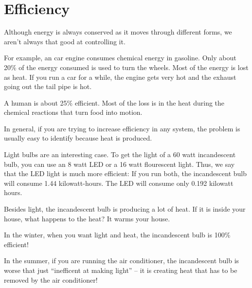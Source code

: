 \section{Efficiency}

Although energy is always conserved as it moves through different
forms, we aren't always that good at controlling it.

For example, an car engine consumes chemical energy in gasoline. Only
about 20\% of the energy consumed is used to turn the wheels.  Most of
the energy is lost as heat. If you run a car for a while, the engine
gets very hot and the exhaust going out the tail pipe is hot.

A human is about 25\% efficient. Most of the loss is in the heat
during the chemical reactions that turn food into motion.

In general, if you are trying to increase efficiency in any system,
the problem is usually easy to identify because heat is produced.

Light bulbs are an interesting case. To get the light of a 60 watt
incandescent bulb, you can use an 8 watt LED or a 16 watt flourescent
light. Thus, we say that the LED light is much more efficient: If you
run both, the incandescent bulb will consume 1.44 kilowatt-hours. The
LED will consume only 0.192 kilowatt hours.

Besides light, the incandescent bulb is producing a lot of heat. If it
is inside your house, what happens to the heat? It warms your house.

In the winter, when you want light and heat, the incandescent bulb is
100\% efficient!

In the summer, if you are running the air conditioner, the
incandescent bulb is worse that just ``inefficent at making light'' --
it is creating heat that has to be removed by the air conditioner! 
